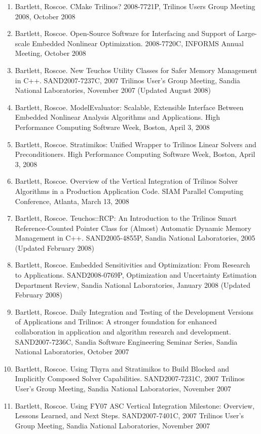 \documentclass{report}
\begin{document}
\begin{enumerate}
%
{}\item Bartlett, Roscoe. CMake Trilinos?  2008-7721P, Trilinos Users Group Meeting 2008, October 2008
%
{}\item Bartlett, Roscoe. Open-Source Software for Interfacing and Support of Large-scale Embedded Nonlinear Optimization.  2008-7720C, INFORMS Annual Meeting, October 2008
%
{}\item Bartlett, Roscoe. New Teuchos Utility Classes for Safer Memory Management in C++. SAND2007-7237C, 2007 Trilinos User's Group Meeting, Sandia National Laboratories, November 2007 (Updated August 2008)
%
{}\item Bartlett, Roscoe.  ModelEvaluator: Scalable, Extensible Interface Between Embedded Nonlinear Analysis Algorithms and Applications.  High Performance Computing Software Week, Boston, April 3, 2008
%
{}\item Bartlett, Roscoe.  Stratimikos: Unified Wrapper to Trilinos Linear Solvers and Preconditioners.  High Performance Computing Software Week, Boston, April 3, 2008
%
{}\item Bartlett, Roscoe.  Overview of the Vertical Integration of Trilinos Solver Algorithms in a Production Application Code.  SIAM Parallel Computing Conference, Atlanta, March 13, 2008
%
{}\item Bartlett, Roscoe.  Teuchos::RCP: An Introduction to the Trilinos Smart Reference-Counted Pointer Class for (Almost) Automatic Dynamic Memory Management in C++.  SAND2005-4855P, Sandia National Laboratories, 2005 (Updated February 2008)
%
{}\item Bartlett, Roscoe. Embedded Sensitivities and Optimization: From Research to Applications. SAND2008-0769P, Optimization and Uncertainty Estimation Department Review, Sandia National Laboratories, January 2008 (Updated February 2008)
%
{}\item Bartlett, Roscoe. Daily Integration and Testing of the Development Versions of Applications and Trilinos: A stronger foundation for enhanced collaboration in application and algorithm research and development. SAND2007-7236C, Sandia Software Engineering Seminar Series, Sandia National Laboratories, October 2007
%
{}\item Bartlett, Roscoe. Using Thyra and Stratimikos to Build Blocked and Implicitly Composed Solver Capabilities. SAND2007-7231C, 2007 Trilinos User's Group Meeting, Sandia National Laboratories, November 2007
%
{}\item Bartlett, Roscoe. Using FY07 ASC Vertical Integration Milestone: Overview, Lessons Learned, and Next Steps. SAND2007-7401C, 2007 Trilinos User's Group Meeting, Sandia National Laboratories, November 2007
%
\end{enumerate}
%
\end{document}
